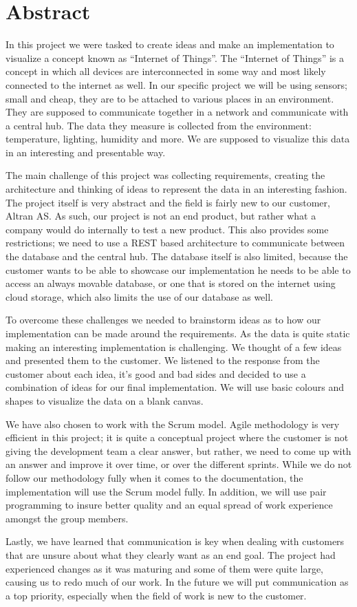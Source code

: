 ﻿\documentclass[../document.tex]{subfiles}
\begin{document}
\section*{Abstract}
In this project we were tasked to create ideas and make an implementation to visualize a concept known as “Internet of Things”. The “Internet of Things” is a concept in which all devices are interconnected in some way and most likely connected to the internet as well. In our specific project we will be using sensors; small and cheap, they are to be attached to various places in an environment. They are supposed to communicate together in a network and communicate with a central hub. The data they measure is collected from the environment: temperature, lighting, humidity and more. We are supposed to visualize this data in an interesting and presentable way.

The main challenge of this project was collecting requirements, creating the architecture and thinking of ideas to represent the data in an interesting fashion. The project itself is very abstract and the field is fairly new to our customer, Altran AS. As such, our project is not an end product, but rather what a company would do internally to test a new product. This also provides some restrictions; we need to use a REST based architecture to communicate between the database and the central hub. The database itself is also limited, because the customer wants to be able to showcase our implementation he needs to be able to access an always movable database, or one that is stored on the internet using cloud storage, which also limits the use of our database as well.

To overcome these challenges we needed to brainstorm ideas as to how our implementation can be made around the requirements. As the data is quite static making an interesting implementation is challenging. We thought of a few ideas and presented them to the customer. We listened to the response from the customer about each idea, it’s good and bad sides and decided to use a combination of ideas for our final implementation. We will use basic colours and shapes to visualize the data on a blank canvas.

We have also chosen to work with the Scrum model. Agile methodology is very efficient in this project; it is quite a conceptual project where the customer is not giving the development team a clear answer, but rather, we need to come up with an answer and improve it over time, or over the different sprints. While we do not follow our methodology fully when it comes to the documentation, the implementation will use the Scrum model fully. In addition, we will use pair programming to insure better quality and an equal spread of work experience amongst the group members.

Lastly, we have learned that communication is key when dealing with customers that are unsure about what they clearly want as an end goal. The project had experienced changes as it was maturing and some of them were quite large, causing us to redo much of our work. In the future we will put communication as a top priority, especially when the field of work is new to the customer.
\end{document}
